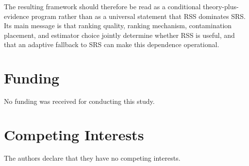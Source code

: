 \documentclass[12pt]{article}
\begin{document}
The resulting framework should therefore be read as a conditional theory-plus-evidence program rather than as a universal statement that RSS dominates SRS. Its main message is that ranking quality, ranking mechanism, contamination placement, and estimator choice jointly determine whether RSS is useful, and that an adaptive fallback to SRS can make this dependence operational.

\section*{Funding}
No funding was received for conducting this study.

\section*{Competing Interests}
The authors declare that they have no competing interests.






\end{document}
